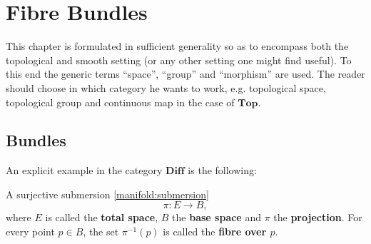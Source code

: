 \chapter{Fibre Bundles}\label{chapter:bundles}

    This chapter is formulated in sufficient generality so as to encompass both the topological and smooth setting (or any other setting one might find useful). To this end the generic terms ``space'', ``group'' and ``morphism'' are used. The reader should choose in which category he wants to work, e.g. topological space, topological group and continuous map in the case of $\mathbf{Top}$.

\section{Bundles}

    An explicit example in the category $\mathbf{Diff}$ is the following:
    \begin{example}
        A surjective submersion \ref{manifold:submersion} \[\pi:E\rightarrow B,\] where $E$ is called the \textbf{total space}, $B$ the \textbf{base space} and $\pi$ the \textbf{projection}. For every point $p\in B$, the set $\pi^{-1}(p)$ is called the \textbf{fibre over $p$}.
    \end{example}

